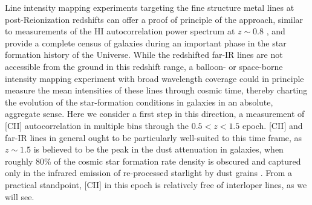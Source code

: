\documentclass[iop]{emulateapj}
\begin{document}

Line intensity mapping experiments targeting the fine structure metal lines at post-Reionization redshifts can offer a proof of principle of the approach, similar to measurements of the HI autocorrelation power spectrum at $z\sim0.8$ \citep{chang10, switzer13}, and provide a complete census of galaxies during an important phase in the star formation history of the Universe. While the redshifted far-IR lines are not accessible from the ground in this redshift range, a balloon- or space-borne intensity mapping experiment with broad wavelength coverage could in principle measure the mean intensities of these lines through cosmic time, thereby charting the evolution of the star-formation conditions in galaxies in an absolute, aggregate sense.   Here we consider a first step in this direction, a measurement of [CII] autocorrelation in multiple bins through the $0.5 < z < 1.5$ epoch.   [CII] and far-IR lines in general ought to be particularly well-suited to this time frame, as $z\sim1.5$ is believed to be the peak in the dust attenuation in galaxies, when roughly 80\% of the cosmic star formation rate density is obscured and captured only in the infrared emission of re-processed starlight by dust grains \citep{burgarella13}.   From a practical standpoint, [CII] in this epoch is relatively free of interloper lines, as we will see.
\end{document}
